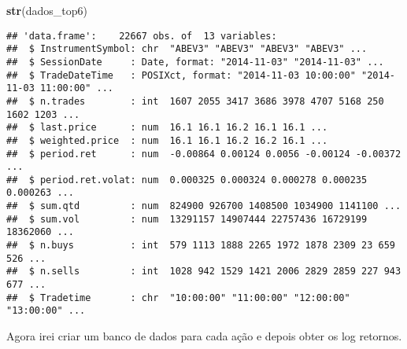 \documentclass[]{article}
\newenvironment{Shaded}{\begin{snugshade}}{\end{snugshade}}
\newcommand{\KeywordTok}[1]{\textcolor[rgb]{0.13,0.29,0.53}{\textbf{{#1}}}}
\newcommand{\NormalTok}[1]{{#1}}
\begin{document}
\begin{Shaded}
\begin{Highlighting}[]
\KeywordTok{str}\NormalTok{(dados_top6)}
\end{Highlighting}
\end{Shaded}

\begin{verbatim}
## 'data.frame':    22667 obs. of  13 variables:
##  $ InstrumentSymbol: chr  "ABEV3" "ABEV3" "ABEV3" "ABEV3" ...
##  $ SessionDate     : Date, format: "2014-11-03" "2014-11-03" ...
##  $ TradeDateTime   : POSIXct, format: "2014-11-03 10:00:00" "2014-11-03 11:00:00" ...
##  $ n.trades        : int  1607 2055 3417 3686 3978 4707 5168 250 1602 1203 ...
##  $ last.price      : num  16.1 16.1 16.2 16.1 16.1 ...
##  $ weighted.price  : num  16.1 16.1 16.2 16.2 16.1 ...
##  $ period.ret      : num  -0.00864 0.00124 0.0056 -0.00124 -0.00372 ...
##  $ period.ret.volat: num  0.000325 0.000324 0.000278 0.000235 0.000263 ...
##  $ sum.qtd         : num  824900 926700 1408500 1034900 1141100 ...
##  $ sum.vol         : num  13291157 14907444 22757436 16729199 18362060 ...
##  $ n.buys          : int  579 1113 1888 2265 1972 1878 2309 23 659 526 ...
##  $ n.sells         : int  1028 942 1529 1421 2006 2829 2859 227 943 677 ...
##  $ Tradetime       : chr  "10:00:00" "11:00:00" "12:00:00" "13:00:00" ...
\end{verbatim}

Agora irei criar um banco de dados para cada ação e depois obter os log
retornos.
\end{document}

